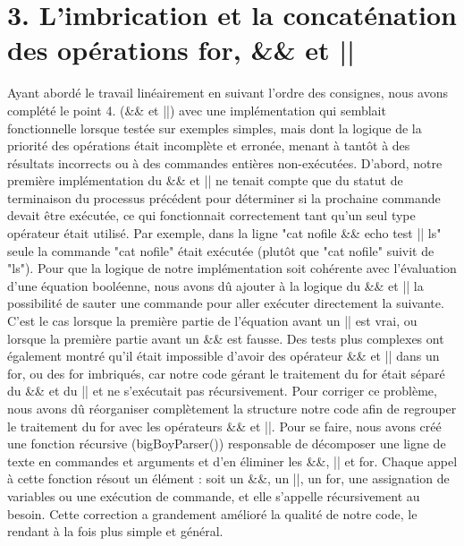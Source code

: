 \documentclass{article}
\begin{document}
\section*{ 3. L’imbrication et la concaténation des opérations for, \&\& et || }
Ayant abordé le travail linéairement en suivant l’ordre des consignes, nous avons complété le point 4. (\&\& et ||) avec une implémentation qui semblait fonctionnelle lorsque testée sur exemples simples, mais dont la logique de la priorité des opérations était incomplète et erronée, menant à 
 tantôt à des résultats incorrects ou à des commandes entières non-exécutées.  
D’abord, notre première implémentation du \&\& et || ne tenait compte que du statut de terminaison du processus précédent pour déterminer si la prochaine commande devait être exécutée, ce qui fonctionnait correctement tant qu’un seul type opérateur était utilisé. Par exemple, dans la ligne "cat nofile \&\& echo test || ls" seule la commande "cat nofile" était exécutée (plutôt que "cat nofile" suivit de "ls").  Pour que la logique de notre implémentation soit cohérente avec l’évaluation d’une équation booléenne, nous avons dû ajouter à la logique du \&\& et || la possibilité de sauter une commande pour aller exécuter directement la suivante. C’est le cas lorsque la première partie de l’équation avant un || est vrai, ou lorsque la première partie avant un \&\& est fausse.
Des tests plus complexes ont également montré qu’il était impossible d’avoir des opérateur \&\& et || dans un for, ou des for imbriqués, car notre code gérant le traitement du for était séparé du \&\& et du || et ne s’exécutait pas récursivement. Pour corriger ce problème, nous avons dû réorganiser complètement la structure notre code afin de regrouper le traitement du for avec les opérateurs \&\& et ||. Pour se faire, nous avons créé une fonction récursive (bigBoyParser()) responsable de décomposer une ligne de texte en commandes et arguments et d’en éliminer les \&\&, || et for. Chaque appel à cette fonction résout un élément : soit un \&\&, un ||, un for, une assignation de variables ou une exécution de commande, et elle s’appelle récursivement au besoin. Cette correction a grandement amélioré la qualité de notre code, le rendant à la fois plus simple et général. 
\end{document}
